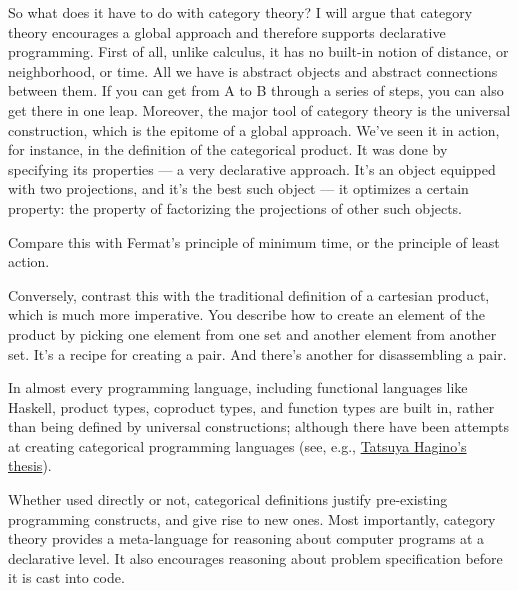So what does it have to do with category theory? I will argue that
category theory encourages a global approach and therefore supports
declarative programming. First of all, unlike calculus, it has no
built-in notion of distance, or neighborhood, or time. All we have is
abstract objects and abstract connections between them. If you can get
from A to B through a series of steps, you can also get there in one
leap. Moreover, the major tool of category theory is the universal
construction, which is the epitome of a global approach. We've seen it
in action, for instance, in the definition of the categorical product.
It was done by specifying its properties --- a very declarative
approach. It's an object equipped with two projections, and it's the
best such object --- it optimizes a certain property: the property of
factorizing the projections of other such objects.

\begin{figure}
\centering
{}
\end{figure}

Compare this with Fermat's principle of minimum time, or the principle
of least action.

Conversely, contrast this with the traditional definition of a cartesian
product, which is much more imperative. You describe how to create an
element of the product by picking one element from one set and another
element from another set. It's a recipe for creating a pair. And there's
another for disassembling a pair.

In almost every programming language, including functional languages
like Haskell, product types, coproduct types, and function types are
built in, rather than being defined by universal constructions; although
there have been attempts at creating categorical programming languages
(see, e.g.,
\href{http://synrc.com/publications/cat/Category\%20Theory/Type\%20Theory/Hagino\%20T.\%20A\%20Categorical\%20Programming\%20Language.pdf}{Tatsuya
Hagino's thesis}).

Whether used directly or not, categorical definitions justify
pre-existing programming constructs, and give rise to new ones. Most
importantly, category theory provides a meta-language for reasoning
about computer programs at a declarative level. It also encourages
reasoning about problem specification before it is cast into code.